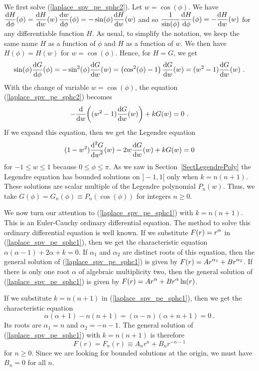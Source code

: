 \begin{egg}
We first solve (\ref{laplace_spv_pe_sphc2}).  Let $w = \cos(\phi)$.
We have \\
$\DS \dydx{H}{\phi}(\phi) = \dydx{H}{w}(w)\, \dydx{w}{\phi}(\phi)
= -\sin(\phi) \dydx{H}{w}(w)$
and so
$\DS \frac{1}{\sin(\phi)} \dydx{H}{\phi}(\phi) = -\dydx{H}{w}(w)$
for any differentiable function $H$.  As usual, to simplify the notation, we
keep the same name $H$ as a function of $\phi$ and $H$ as a function of
$w$.  We then have $H(\phi) = H(w)$ for $w=\cos(\phi)$.
Hence, for $H=G$, we get
\[
\sin(\phi) \dydx{G}{\phi}(\phi) = - \sin^2(\phi) \dydx{G}{w}(w)
= \left( \cos^2(\phi) - 1 \right) \dydx{G}{w}(w)
= (w^2-1)  \dydx{G}{w}(w) \ .
\]
With the change of variable $w = \cos(\phi)$, the equation
(\ref{laplace_spv_pe_sphc2}) becomes
\[
- \dfdx{ \left( (w^2-1) \dydx{G}{w}(w) \right) }{w} + k G(w) = 0 \ .
\]
If we expand this equation, then we get the Legendre equation
\[
(1-w^2) \dydxn{G}{w}{2}(w) -2 w \dydx{G}{w}(w) + k G(w) = 0
\]
for $-1 \leq w \leq 1$ because $0 \leq \phi \leq \pi$.  As we saw in
Section~\ref{SectLegendrePoly}
the Legendre equation has bounded solutions on $]-1,1[$ only when
$k=n(n+1)$.  These solutions are scalar
multiple of the Legendre polynomial $P_n(w)$. Thus, we take
$G(\phi) = G_n(\phi) \equiv P_n(\cos(\phi))$ for integers $n \geq 0$.

We now turn our attention to (\ref{laplace_spv_pe_sphc1}) with $k=n(n+1)$.
This is an Euler-Cauchy ordinary differential equation.  The method to
solve this ordinary differential equation is well known.  If we
substitute $\DS F(r) = r^\alpha$ in
(\ref{laplace_spv_pe_sphc1}), then we get the characteristic equation
$\alpha(\alpha-1) + 2 \alpha + k=0$.  If $\alpha_1$ and $\alpha_2$ are
distinct roots of this equation, then the general solution of
(\ref{laplace_spv_pe_sphc1}) is given by
$\DS F(r) = A r^{\alpha_1} + B r^{\alpha_2}$.  If there is
only one root $\alpha$ of algebraic multiplicity two, then the general
solution of (\ref{laplace_spv_pe_sphc1}) is given by
$\DS F(r) = A r^{\alpha} + B r^{\alpha}\ln(r)$.

If we substitute $k=n(n+1)$ in (\ref{laplace_spv_pe_sphc1}), then we get
the characteristic equation
\[
\alpha(\alpha+1) - n(n+1) = (\alpha-n)(\alpha+n+1) = 0 \ .
\]
Its roots are $\alpha_1 = n$ and $\alpha_2 = -n-1$.  The general
solution of (\ref{laplace_spv_pe_sphc1}) with $k=n(n+1)$ is therefore
\begin{equation} \label{laplace_spv_pe_sphc3}
F(r) = F_n(r) \equiv A_n r^n + B_n r^{-n-1}
\end{equation}
for $n \geq 0$.  Since we are looking for bounded solutions at the
origin, we must have $B_n = 0$ for all $n$.


\end{egg}
